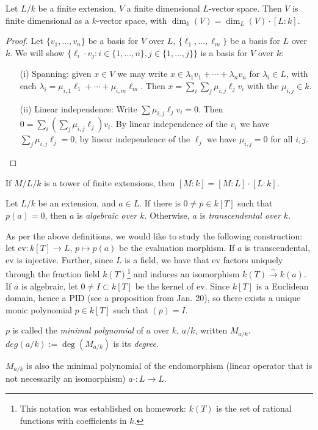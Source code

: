 \begin{prop} \label{Prop 7, Jan 27}
Let $L/k$ be a finite extension, $V$ a finite dimensional $L$-vector space. Then $V$ is finite dimensional as a $k$-vector space, with $\dim_k(V) = \dim_L(V) \cdot [L : k]$.
\end{prop}
\begin{proof}
Let $\{v_1, ..., v_n\}$ be a basis for $V$ over $L$, $\{\ell_1, ..., \ell_m\}$ be a basis for $L$ over $k$. We will show $\{\ell_i \cdot v_j \colon i \in \{1, ..., n\}, j \in \{1, ..., j\}\}$ is a basis for $V$ over $k$:
\begin{enumerate}
\item[(i)] Spanning: given $x \in V$ we may write $x \in \lambda_1v_1 + \cdots + \lambda_nv_n$ for $\lambda_i \in L$, with each $\lambda_i = \mu_{i,1}\ell_1 + \cdots + \mu_{i,m}\ell_m$. Then $x = \sum_i \sum_j \mu_{i, j} \ell_j v_i$ with the $\mu_{i,j} \in k$.
\item[(ii)] Linear independence: Write $\sum \mu_{i,j} \ell_j v_i = 0$. Then $0 = \sum_i \left( \sum_j\mu_{i,j} \ell_j \right) v_i$. By linear independence of the $v_i$ we have $\sum_j\mu_{i,j} \ell_j = 0$, by linear independence of the $\ell_j$ we have $\mu_{i,j} = 0$ for all $i,j$.
\end{enumerate}
\end{proof}

\begin{cor}\label{Cor 8, Jan 27}
If $M/L/k$ is a tower of finite extensions, then $[M : k] = [M : L] \cdot [L : k]$.
\end{cor}

\begin{defn} \label{Defn 9, Jan 27}
Let $L/k$ be an extension, and $a \in L$. If there is $0 \neq p \in k[T]$ such that $p(a) = 0$, then $a$ is \textit{algebraic over $k$}. Otherwise, $a$ is \textit{transcendental over $k$}.
\end{defn}

As per the above definitions, we would like to study the following construction: let $\text{ev} \colon k[T] \rightarrow L$, $p \mapsto p(a)$ be the evaluation morphism. If $a$ is transcendental, ev is injective. Further, since $L$ is a field, we have that ev factors uniquely through the fraction field $k(T)$\footnote{This notation was established on homework: $k(T)$ is the set of rational functions with coefficients in $k$.} and induces an isomorphism $k(T) \stackrel{\sim}{\rightarrow} k(a)$. If $a$ is algebraic, let $0 \neq I \subset k[T]$ be the kernel of ev. Since $k[T]$ is a Euclidean domain, hence a PID (see a proposition from Jan. 20), so there exists a unique monic polynomial $p \in k[T]$ such that $(p) = I$.

\begin{defn} \label{Defn 10, Jan 27}
$p$ is called the \textit{minimal polynomial} of $a$ over $k$, $a/k$, written $M_{a/k}$. $deg(a/k) := \deg(M_{a/k})$ is its \textit{degree}.
\end{defn}

\begin{rmk}
$M_{a/k}$ is also the minimal polynomial of the endomorphism (linear operator that is not necessarily an isomorphism) $a \cdot \colon L \rightarrow L$.
\end{rmk}
